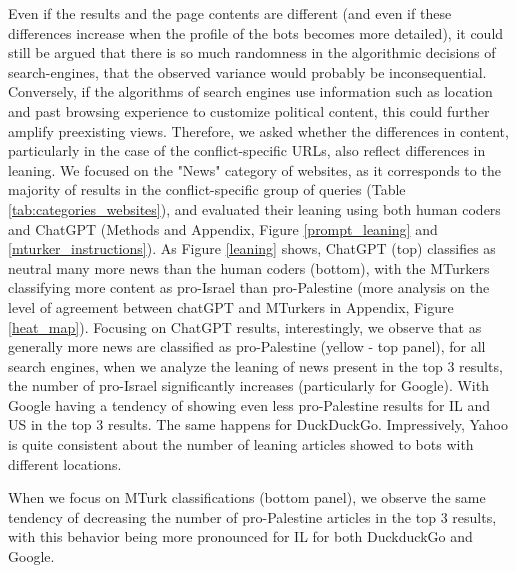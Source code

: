 Even if the results and the page contents are different (and even if these differences increase when the profile of the bots becomes more detailed), it could still be argued that there is so much randomness in the algorithmic decisions of search-engines, that the observed variance would probably be inconsequential. Conversely, if the algorithms of search engines use information such as location and past browsing experience to customize political content, this could further amplify preexisting views. %
Therefore, we asked whether the differences in content, particularly in the case of the conflict-specific URLs, also reflect differences in leaning. We focused on the "News" category of websites, as it corresponds to the majority of results in the conflict-specific group of queries (Table \ref{tab:categories_websites}), and evaluated their leaning using both human coders and ChatGPT (Methods and Appendix, Figure \ref{prompt_leaning} and \ref{mturker_instructions}). 
As Figure \ref{leaning} shows, ChatGPT (top) classifies as neutral many more news than the human coders (bottom), with the MTurkers classifying more content as pro-Israel than pro-Palestine (more analysis on the level of agreement between chatGPT and MTurkers in Appendix, Figure \ref{heat_map}). Focusing on ChatGPT results, interestingly, we observe that as generally more news are classified as pro-Palestine (yellow - top panel), for all search engines, when we analyze the leaning of news present in the top 3 results, the number of pro-Israel significantly increases (particularly for Google). With Google having a tendency of showing even less pro-Palestine results for IL and US in the top 3 results. The same happens for DuckDuckGo. Impressively, Yahoo is quite consistent about the number of leaning articles showed to bots with different locations. 

When we focus on MTurk classifications (bottom panel), we observe the same tendency of decreasing the number of pro-Palestine articles in the top 3 results, with this behavior being more pronounced for IL for both DuckduckGo and Google. 


